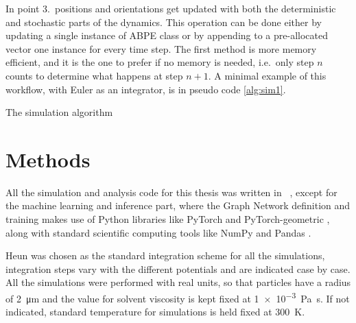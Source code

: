 \documentclass[../../master_thesis_np.tex]{subfiles}
\begin{document}
	In point 3.\ positions and orientations get updated with both the deterministic and stochastic parts of the dynamics. This operation can be done either by updating a single instance of ABPE class or by appending to a pre-allocated vector one instance for every time step. The first method is more memory efficient, and it is the one to prefer if no memory is needed, i.e.\ only step $n$ counts to determine what happens at step $n+1$. A minimal example of this workflow, with Euler as an integrator, is in pseudo code \ref{alg:sim1}.
	
	\begin{algorithm}
		\caption{The simulation algorithm} \label{alg:sim1}	
		\begin{algorithmic}[1]
			\EndFor
			\EndFor
			\EndFor
		\end{algorithmic}
	\end{algorithm}  
	
	\section{Methods}
	All the simulation and analysis code for this thesis was written in \julia\ \cite{julia}, except for the machine learning and inference part, where the Graph Network definition and training makes use of Python libraries like PyTorch \cite{pytorch} and PyTorch-geometric \cite{pyg}, along with standard scientific computing tools like NumPy \cite{numpy} and Pandas \cite{pandas}.
	

	Heun was chosen as the standard integration scheme for all the simulations, integration steps vary with the different potentials and are indicated case by case. All the simulations were performed with real units, so that particles have a radius of \SI{2}{\um} and the value for solvent viscosity is kept fixed at \SI{1e-3}{\pascal\second}. If not indicated, standard temperature for simulations is held fixed at \SI{300}{\kelvin}.
	
\end{document}

